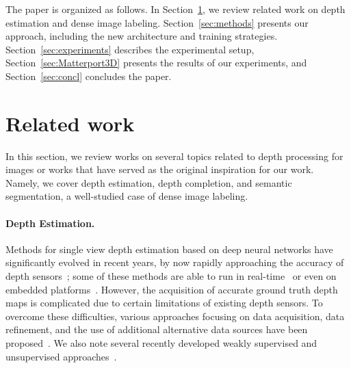 \documentclass[final]{cvpr}
\begin{document}
    The paper is organized as follows. In Section~\ref{sec:related}, we review related work on depth estimation and dense image labeling. Section~\ref{sec:methods} presents our approach, including the new architecture and training strategies. Section~\ref{sec:experiments} describes the experimental setup, Section~\ref{sec:Matterport3D} presents the results of our experiments, and Section~\ref{sec:concl} concludes the paper.
    


    




    














\section{Related work}\label{sec:related}

    In this section, we review works on several topics related to depth processing for images or works that have served as the original inspiration for our work. Namely, we cover depth estimation, depth completion, and semantic segmentation, a well-studied case of dense image labeling.
    
    \paragraph{Depth Estimation.}
    
    Methods for single view depth estimation based on deep neural networks have significantly evolved in recent years, by now rapidly approaching the accuracy of depth sensors~\cite{casser2018depth, fu2018deep, liang2018learning, luo2016efficient}; some of these methods are able to run in real-time~\cite{icra_2019_fastdepth} or even on embedded platforms~\cite{Ambarella}. However, the acquisition of accurate ground truth depth maps is complicated due to certain limitations of existing depth sensors. To overcome these difficulties, various approaches focusing on data acquisition, data refinement, and the use of additional alternative data sources have been proposed~\cite{DBLP:journals/corr/abs-1804-00607, DBLP:journals/corr/abs-1907-01341}. We also note several recently developed weakly supervised and unsupervised approaches~\cite{Ren_2020_CVPR_Workshops, 8100182}. 
\end{document}
